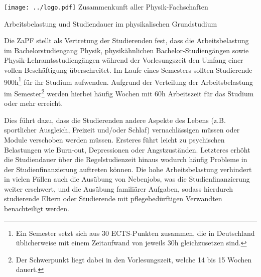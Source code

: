 \documentclass[DIV=calc]{scrartcl}
\begin{document}
\hspace{0.87\textwidth}
\begin{minipage}{120pt}
\vspace{-1.8cm}
\texttt{[image: ../logo.pdf]}
\centering
\small Zusammenkunft aller Physik-Fachschaften
\end{minipage}

\begin{center}
  \huge{Arbeitsbelastung und Studiendauer im physikalischen Grundstudium}\vspace{.25\baselineskip}\\
  \normalsize
\end{center}
\vspace{1cm}






Die ZaPF stellt als Vertretung der Studierenden fest, dass die Arbeitsbelastung im Bachelorstudiengang Physik, physikähnlichen Bachelor-Studiengängen sowie Physik-Lehramtsstudiengängen während der Vorlesungszeit den Umfang einer vollen Beschäftigung überschreitet. Im Laufe eines Semesters sollten Studierende 900h\footnote{Ein Semester setzt sich aus 30 ECTS-Punkten zusammen, die in Deutschland üblicherweise mit einem Zeitaufwand von jeweils 30h gleichzusetzen sind.} für ihr Studium aufwenden. Aufgrund der Verteilung der Arbeitsbelastung im Semester\footnote{Der Schwerpunkt liegt dabei in den Vorlesungszeit, welche 14 bis 15 Wochen dauert.} werden hierbei häufig Wochen mit 60h Arbeitszeit für das Studium oder mehr erreicht. 

Dies führt dazu, dass die Studierenden andere Aspekte des Lebens (z.B. sportlicher Ausgleich, Freizeit und/oder Schlaf) vernachlässigen müssen oder Module verschoben werden müssen. Ersteres führt leicht zu psychischen Belastungen wie Burn-out, Depressionen oder Angstzuständen. Letzteres erhöht die Studiendauer über die Regelstudienzeit hinaus wodurch häufig Probleme in der Studienfinanzierung auftreten können. Die hohe Arbeitsbelastung verhindert in vielen Fällen auch die Ausübung von Nebenjobs, was die Studienfinanzierung weiter erschwert, und die Ausübung familiärer Aufgaben, sodass hierdurch studierende Eltern oder Studierende mit pflegebedürftigen Verwandten benachteiligt werden.
\end{document}
